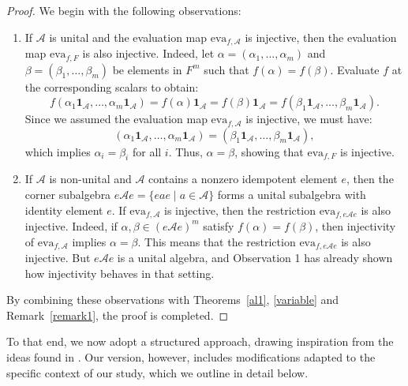 \documentclass{amsart}
\theoremstyle{definition}
\begin{document}
	\begin{proof}
		We begin with the following observations:
		\begin{enumerate}
			\item If  \( \mathcal{A} \) is unital and the evaluation map  \( \mathrm{eva}_{f,\mathcal{A}} \) is injective, then the evaluation map  \( \mathrm{eva}_{f,F} \) is also injective. Indeed, let \( \alpha = (\alpha_1, \ldots, \alpha_m) \) and \( \beta = (\beta_1, \ldots, \beta_m) \) be elements in \( F^m \) such that \( f(\alpha) = f(\beta) \). Evaluate \( f \) at the corresponding scalars  to obtain:
			\[
			f(\alpha_1 \mathbf{1}_\mathcal{A}, \ldots, \alpha_m \mathbf{1}_\mathcal{A}) = f(\alpha) \mathbf{1}_\mathcal{A} = f(\beta) \mathbf{1}_\mathcal{A} = f(\beta_1 \mathbf{1}_\mathcal{A}, \ldots, \beta_m \mathbf{1}_\mathcal{A}).
			\]
			Since we assumed the evaluation map  \( \mathrm{eva}_{f,\mathcal{A}} \) is injective, we must have:
			\[
			(\alpha_1 \mathbf{1}_\mathcal{A}, \ldots, \alpha_m \mathbf{1}_\mathcal{A}) = (\beta_1 \mathbf{1}_\mathcal{A}, \ldots, \beta_m \mathbf{1}_\mathcal{A}),
			\]
			which implies \( \alpha_i = \beta_i \) for all \( i \). Thus, \( \alpha = \beta \), showing that \( \mathrm{eva}_{f,F} \) is injective.
			\item If \( \mathcal{A} \) is non-unital and \( \mathcal{A} \) contains a nonzero idempotent element \( e \), then the corner subalgebra \( e \mathcal{A} e = \{ eae \mid a \in \mathcal{A} \} \) forms a unital subalgebra with identity element \( e \).	If \( \mathrm{eva}_{f,\mathcal{A}} \) is injective, then the restriction \( \mathrm{eva}_{f,e\mathcal{A}e} \) is also injective. Indeed, if \( \alpha, \beta \in (e\mathcal{A}e)^m \) satisfy \( f(\alpha) = f(\beta) \), then injectivity of \( \mathrm{eva}_{f,\mathcal{A}} \) implies \( \alpha = \beta \). This means that the restriction \( \mathrm{eva}_{f,e\mathcal{A}e} \) is also injective. But \( e\mathcal{A}e \) is a unital algebra, and Observation 1 has already shown how injectivity behaves in that setting.
		\end{enumerate} By combining these observations with Theorems~\ref{al1}, \ref{variable} and Remark~\ref{remark1}, the proof is completed.
	\end{proof}
	
	
	
	
	To that end, we now adopt a structured approach, drawing inspiration from the ideas found in  \cite[Lemma 4.2]{Pa_BuReSa_19}. Our version, however, includes modifications adapted to the specific context of our study, which we outline in detail below.
	
\end{document}
